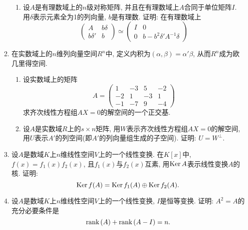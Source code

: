 \documentclass[12pt,a4paper,openany]{book}
\newcommand\Ker{\text{Ker\,}}
\newcommand\rank{\text{rank\,}}
\begin{document}
\begin{enumerate}
\begin{enumerate}
\item 设$A$是有理数域上的$n$级对称矩阵, 并且在有理数域上$A$合同于单位矩阵$I$. 用$\delta$表示元素全为1的列向量, $b$是有理数. 证明: 在有理数域上
\[
\begin{pmatrix}
A & b\delta \\
b\delta' & b
\end{pmatrix} \simeq
\begin{pmatrix}
I & 0 \\
0 & b - b^2\delta'A^{-1}\delta
\end{pmatrix}
\]
\end{enumerate}

\item 在实数域上的$n$维列向量空间$R^n$中, 定义内积为$(\alpha, \beta) = \alpha'\beta$, 从而$R^n$成为欧几里得空间.
\begin{enumerate}
\item 设实数域上的矩阵
\[
A = \begin{pmatrix}
1 & -3 & 5 & -2 \\
-2 & 1 & -3 & 1 \\
-1 & -7 & 9 & -4
\end{pmatrix}
\]
求齐次线性方程组$AX = 0$的解空间的一个正交基.

\item 设$A$是实数域$R$上的$s \times n$矩阵, 用$W$表示齐次线性方程组$AX = 0$的解空间, 用$U$表示$A'$的列空间(即$A'$的列向量组生成的子空间). 证明: $U = W^{\perp}$.
\end{enumerate}

\item 设$A$是数域$K$上$n$维线性空间$V$上的一个线性变换. 在$K[x]$中, $f(x) = f_1(x)f_2(x)$, 且$f_1(x)$与$f_2(x)$互素, 用$\Ker{A}$表示线性变换$A$的核. 证明:
\[
\Ker{f(A)} = \Ker{f_1(A)} \oplus \Ker{f_2(A)}.
\]

\item 设$A$是数域$K$上$n$维线性空间$V$上的一个线性变换, $I$是恒等变换. 证明: $A^2 = A$的充分必要条件是
\[
\rank(A) + \rank(A - I) = n.
\]

\end{enumerate}
\end{document}
